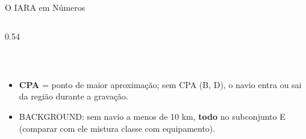 \documentclass[aspectratio=169]{beamer}
\begin{document}
\begin{frame}{O IARA em Números}
\begin{columns}[T]
\begin{column}{0.54\textwidth}
\begin{tabular}{@{}lccrrrr@{}}
                \bottomrule
            \end{tabular}\\[4pt]
            \scriptsize
            \begin{itemize}
                \setlength{\itemsep}{1pt}
                \item \textbf{CPA} = ponto de maior aproximação; sem CPA (B, D), o navio entra ou sai da região durante a gravação.
                \item BACKGROUND: sem navio a menos de 10 km, \textbf{todo} no subconjunto E (comparar com ele mistura classe com equipamento).
            \end{itemize}
        \end{column}
    \end{columns}
\end{frame}
\end{document}
